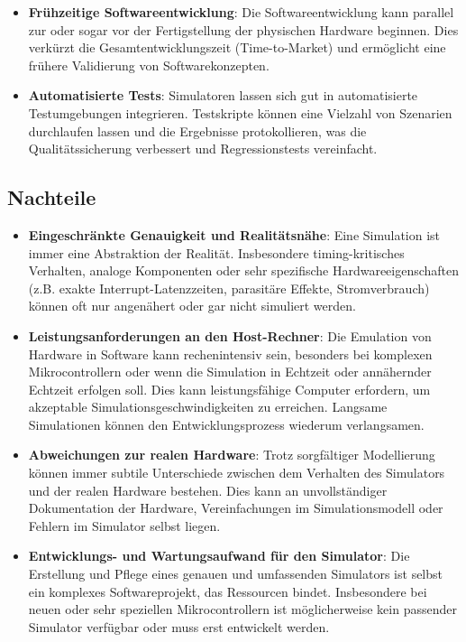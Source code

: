 \begin{itemize}
    \item \textbf{Frühzeitige Softwareentwicklung}: Die Softwareentwicklung kann parallel zur oder sogar vor der Fertigstellung der physischen Hardware beginnen. Dies verkürzt die Gesamtentwicklungszeit (Time-to-Market) und ermöglicht eine frühere Validierung von Softwarekonzepten.
    \item \textbf{Automatisierte Tests}: Simulatoren lassen sich gut in automatisierte Testumgebungen integrieren. Testskripte können eine Vielzahl von Szenarien durchlaufen lassen und die Ergebnisse protokollieren, was die Qualitätssicherung verbessert und Regressionstests vereinfacht.
\end{itemize}

\subsection*{Nachteile}
\begin{itemize}
    \item \textbf{Eingeschränkte Genauigkeit und Realitätsnähe}: Eine Simulation ist immer eine Abstraktion der Realität. Insbesondere timing-kritisches Verhalten, analoge Komponenten oder sehr spezifische Hardwareeigenschaften (z.B. exakte Interrupt-Latenzzeiten, parasitäre Effekte, Stromverbrauch) können oft nur angenähert oder gar nicht simuliert werden. 
    \item \textbf{Leistungsanforderungen an den Host-Rechner}: Die Emulation von Hardware in Software kann rechenintensiv sein, besonders bei komplexen Mikrocontrollern oder wenn die Simulation in Echtzeit oder annähernder Echtzeit erfolgen soll. Dies kann leistungsfähige Computer erfordern, um akzeptable Simulationsgeschwindigkeiten zu erreichen. Langsame Simulationen können den Entwicklungsprozess wiederum verlangsamen.
    \item \textbf{Abweichungen zur realen Hardware}: Trotz sorgfältiger Modellierung können immer subtile Unterschiede zwischen dem Verhalten des Simulators und der realen Hardware bestehen. Dies kann an unvollständiger Dokumentation der Hardware, Vereinfachungen im Simulationsmodell oder Fehlern im Simulator selbst liegen. 
    \item \textbf{Entwicklungs- und Wartungsaufwand für den Simulator}: Die Erstellung und Pflege eines genauen und umfassenden Simulators ist selbst ein komplexes Softwareprojekt, das Ressourcen bindet. Insbesondere bei neuen oder sehr speziellen Mikrocontrollern ist möglicherweise kein passender Simulator verfügbar oder muss erst entwickelt werden.
\end{itemize}
 
